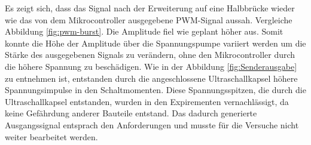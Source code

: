 Es zeigt sich, dass das Signal nach der Erweiterung auf eine Halbbrücke wieder wie das von dem Mikrocontroller ausgegebene PWM-Signal aussah. Vergleiche Abbildung \ref{fig:pwm-burst}. Die Amplitude fiel wie geplant höher aus. Somit konnte die Höhe der Amplitude über die Spannungspumpe variiert werden um die Stärke des ausgegebenen Signals zu verändern, ohne den Mikrocontroller durch die höhere Spannung zu beschädigen. Wie in der Abbildung \ref{fig:Senderausgabe} zu entnehmen ist, entstanden durch die angeschlossene Ultraschallkapsel höhere Spannungsimpulse in den Schaltmomenten. Diese Spannungsspitzen, die durch die Ultraschallkapsel entstanden, wurden in den Expirementen vernachlässigt, da keine Gefährdung anderer Bauteile entstand. Das dadurch generierte Ausgangssignal entsprach den Anforderungen und musste für die Versuche nicht weiter bearbeitet werden.
